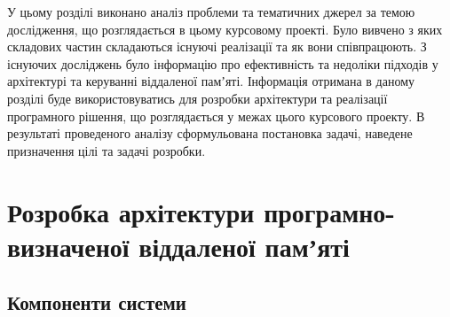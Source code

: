 \documentclass[14pt]{article}
\begin{document}
У цьому розділі виконано аналіз проблеми та тематичних джерел за темою дослідження, що розглядається в цьому курсовому проекті. Було вивчено з яких складових частин складаються існуючі реалізації та як вони співпрацюють. З існуючих досліджень було інформацію про ефективність та недоліки підходів у архітектурі та керуванні віддаленої памʼяті. Інформація отримана в даному розділі буде використовуватись для розробки архітектури та реалізації програмного рішення, що розглядається у межах цього курсового проекту. В результаті проведеного аналізу сформульована постановка задачі, наведене призначення цілі та задачі розробки.

\chapter{Розробка архітектури програмно-визначеної віддаленої памʼяті}

\section{Компоненти системи}
\end{document}
